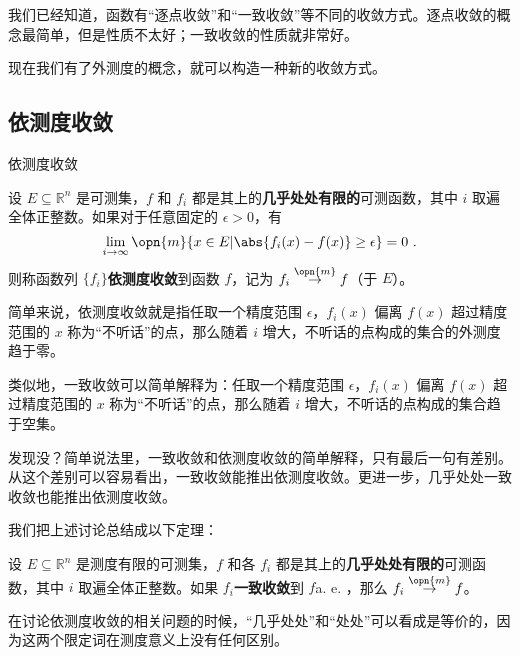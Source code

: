 

我们已经知道，函数有“逐点收敛”和“一致收敛”等不同的收敛方式。逐点收敛的概念最简单，但是性质不太好；一致收敛的性质就非常好。

现在我们有了外测度的概念，就可以构造一种新的收敛方式。

\subsection{依测度收敛}

\begin{definition}{依测度收敛}

设 $E\subseteq \mathbb{R}^n$ 是可测集，$f$ 和 $f_i$ 都是其上的\textbf{几乎处处有限的}可测函数，其中 $i$ 取遍全体正整数。如果对于任意固定的 $\epsilon>0$，有
\begin{equation}
\lim\limits_{i\to\infty}\opn{m}\{x\in E|\abs{f_i(x)-f(x)}\geq\epsilon\}=0~.
\end{equation}
则称函数列 $\{f_i\}$\textbf{依测度收敛}到函数 $f$，记为 $f_i\overset{\opn{m}}\to f$（于 $E$）。

\end{definition}

简单来说，依测度收敛就是指任取一个精度范围 $\epsilon$，$f_i(x)$ 偏离 $f(x)$ 超过精度范围的 $x$ 称为“不听话”的点，那么随着 $i$ 增大，不听话的点构成的集合的外测度趋于零。

类似地，一致收敛可以简单解释为：任取一个精度范围 $\epsilon$，$f_i(x)$ 偏离 $f(x)$ 超过精度范围的 $x$ 称为“不听话”的点，那么随着 $i$ 增大，不听话的点构成的集合趋于空集。

发现没？简单说法里，一致收敛和依测度收敛的简单解释，只有最后一句有差别。从这个差别可以容易看出，一致收敛能推出依测度收敛。更进一步，几乎处处一致收敛也能推出依测度收敛。

我们把上述讨论总结成以下定理：



\begin{theorem}{}\label{the_LimMs_2}

设 $E\subseteq \mathbb{R}^n$ 是测度有限的可测集，$f$ 和各 $f_i$ 都是其上的\textbf{几乎处处有限的}可测函数，其中 $i$ 取遍全体正整数。如果 $f_i$\textbf{一致收敛}到 $f$a. e.  ，那么 $f_i\overset{\opn{m}}\to f$。

\end{theorem}



在讨论依测度收敛的相关问题的时候，“几乎处处”和“处处”可以看成是等价的，因为这两个限定词在测度意义上没有任何区别。

